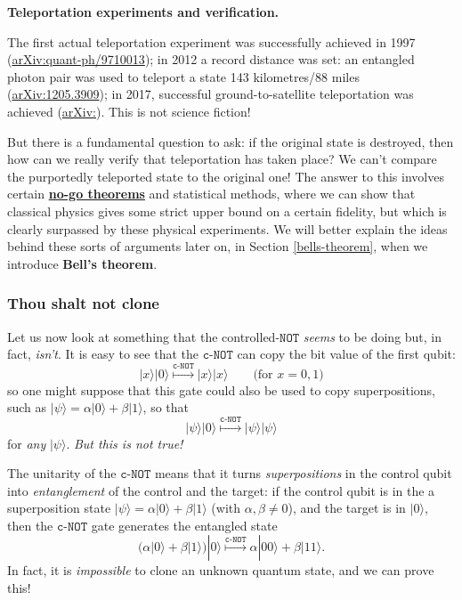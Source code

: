 \documentclass[fleqn,a4paper]{article}
\newenvironment{technical}[1]{\textbf{#1.}\par\vspace{.5\baselineskip}\everypar{\setlength{\parindent}{1.5em}}}{}
\theoremstyle{definition}
\theoremstyle{definition}
\theoremstyle{definition}
\theoremstyle{definition}
\theoremstyle{remark}
\begin{document}
\begin{technical}{Teleportation experiments and verification}
The first actual teleportation experiment was successfully achieved in 1997 (\href{https://arxiv.org/abs/quant-ph/9710013}{arXiv:quant-ph/9710013}); in 2012 a record distance was set: an entangled photon pair was used to teleport a state 143 kilometres/88 miles (\href{https://arxiv.org/abs/1205.3909}{arXiv:1205.3909}); in 2017, successful ground-to-satellite teleportation was achieved (\href{https://arxiv.org/abs/1707.00934}{arXiv:}).
This is not science fiction!

But there is a fundamental question to ask: if the original state is destroyed, then how can we really verify that teleportation has taken place?
We can't compare the purportedly teleported state to the original one!
The answer to this involves certain \href{https://en.wikipedia.org/wiki/No-go_theorem}{\textbf{no-go theorems}} and statistical methods, where we can show that classical physics gives some strict upper bound on a certain fidelity, but which is clearly surpassed by these physical experiments.
We will better explain the ideas behind these sorts of arguments later on, in Section \ref{bells-theorem}, when we introduce \textbf{Bell's theorem}.

\end{technical}

\hypertarget{thou-shalt-not-clone}{%
\subsubsection{Thou shalt not clone}\label{thou-shalt-not-clone}}

Let us now look at something that the controlled-\(\texttt{NOT}\) \emph{seems} to be doing but, in fact, \emph{isn't}.
It is easy to see that the \(\texttt{c-NOT}\) can copy the bit value of the first qubit:
\[
  |x\rangle|0\rangle \overset{\texttt{c-NOT}}{\longmapsto} |x\rangle|x\rangle
  \qquad\text{(for $x=0,1$)}
\]
so one might suppose that this gate could also be used to copy superpositions, such as \(|\psi\rangle = \alpha|0\rangle+\beta|1\rangle\), so that
\[
  |\psi\rangle|0\rangle \overset{\texttt{c-NOT}}{\longmapsto} |\psi\rangle|\psi\rangle
\]
for \emph{any} \(|\psi\rangle\).
\emph{But this is not true!}

The unitarity of the \(\texttt{c-NOT}\) means that it turns \emph{superpositions} in the control qubit into \emph{entanglement} of the control and the target: if the control qubit is in the a superposition state \(|\psi\rangle = \alpha|0\rangle+\beta|1\rangle\) (with \(\alpha,\beta\neq0\)), and the target is in \(|0\rangle\), then the \(\texttt{c-NOT}\) gate generates the entangled state
\[
  \big( \alpha|0\rangle+\beta|1\rangle \big) |0\rangle
  \overset{\texttt{c-NOT}}{\longmapsto}
  \alpha|00\rangle + \beta|11\rangle.
\]
In fact, it is \emph{impossible} to clone an unknown quantum state, and we can prove this!
\end{document}
